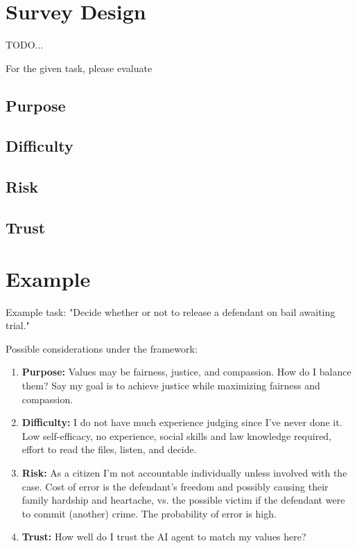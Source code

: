 \documentclass[letterpaper]{article} %
\begin{document}

\section{Survey Design}
TODO...

For the given task, please evaluate 
\subsection{Purpose}
\subsection{Difficulty}
\subsection{Risk}
\subsection{Trust}


\section{Example}
Example task: "Decide whether or not to release a defendant on bail awaiting trial."

Possible considerations under the framework:
\begin{enumerate}
    \item \textbf{Purpose:} Values may be fairness, justice, and compassion. How do I balance them? Say my goal is to achieve justice while maximizing fairness and compassion. 
    \item \textbf{Difficulty:} I do not have much experience judging since I've never done it. Low self-efficacy, no experience, social skills and law knowledge required, effort to read the files, listen, and decide. 
    \item \textbf{Risk:} As a citizen I'm not accountable individually unless involved with the case. Cost of error is the defendant's freedom and possibly causing their family hardship and heartache, vs. the possible victim if the defendant were to commit (another) crime. The probability of error is high.
    \item \textbf{Trust:} How well do I trust the AI agent to match my values here? 
\end{enumerate}
\end{document}
